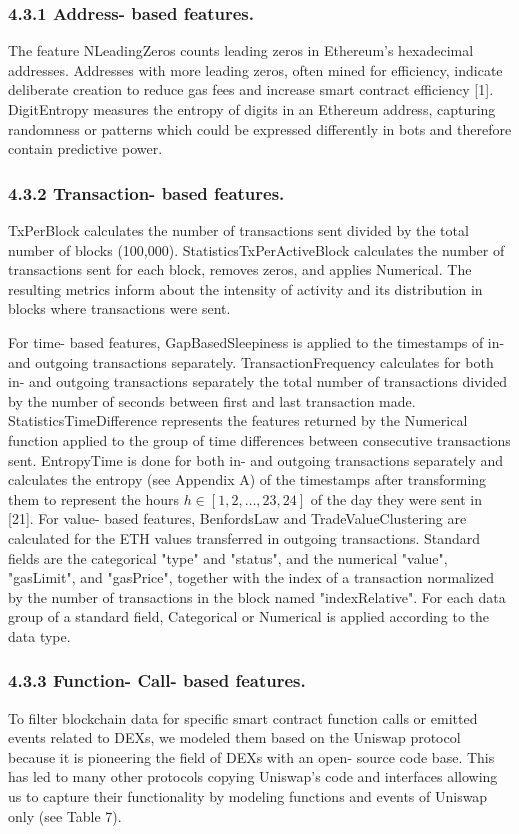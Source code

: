 \subsubsection*{4.3.1 Address- based features.} The feature NLeadingZeros counts leading zeros in Ethereum's hexadecimal addresses. Addresses with more leading zeros, often mined for efficiency, indicate deliberate creation to reduce gas fees and increase smart contract efficiency [1]. DigitEntropy measures the entropy of digits in an Ethereum address, capturing randomness or patterns which could be expressed differently in bots and therefore contain predictive power.

\subsubsection*{4.3.2 Transaction- based features.} TxPerBlock calculates the number of transactions sent divided by the total number of blocks (100,000). StatisticsTxPerActiveBlock calculates the number of transactions sent for each block, removes zeros, and applies Numerical. The resulting metrics inform about the intensity of activity and its distribution in blocks where transactions were sent.

For time- based features, GapBasedSleepiness is applied to the timestamps of in- and outgoing transactions separately. TransactionFrequency calculates for both in- and outgoing transactions separately the total number of transactions divided by the number of seconds between first and last transaction made. StatisticsTimeDifference represents the features returned by the Numerical function applied to the group of time differences between consecutive transactions sent. EntropyTime is done for both in- and outgoing transactions separately and calculates the entropy (see Appendix A) of the timestamps after transforming them to represent the hours \(h\in [1,2,\ldots ,23,24]\) of the day they were sent in [21]. For value- based features, BenfordsLaw and TradeValueClustering are calculated for the ETH values transferred in outgoing transactions. Standard fields are the categorical "type" and "status", and the numerical "value", "gasLimit", and "gasPrice", together with the index of a transaction normalized by the number of transactions in the block named "indexRelative". For each data group of a standard field, Categorical or Numerical is applied according to the data type.

\subsubsection*{4.3.3 Function- Call- based features.} To filter blockchain data for specific smart contract function calls or emitted events related to DEXs, we modeled them based on the Uniswap protocol because it is pioneering the field of DEXs with an open- source code base. This has led to many other protocols copying Uniswap's code and interfaces allowing us to capture their functionality by modeling functions and events of Uniswap only (see Table 7).

